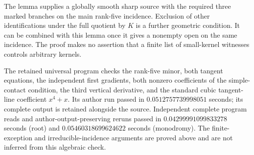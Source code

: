 \begin{remark}
\label{rem:DE-A4-uniform-triple-local-scope}
The lemma supplies a globally smooth sharp source with the required
three marked branches on the main rank-five incidence.
Exclusion of other identifications under the full quotient by $K$
is a further geometric condition.  It can be combined with this
lemma once it gives a nonempty open on the same incidence.
The proof makes no assertion that a finite list of small-kernel
witnesses controls arbitrary kernels.

The retained universal program
checks the rank-five minor, both tangent equations, the independent
first gradients, both nonzero coefficients of the simple-contact
condition, the third vertical derivative, and the standard cubic
tangent-line coefficient $x^4+x$.
Its author run passed in $0.0512757739998051$ seconds; its complete
output is retained alongside the source.
Independent complete program reads and author-output-preserving reruns
passed in $0.04299991099833278$ seconds (root) and
$0.05460318699624622$ seconds (monodromy).
The finite-exception and irreducible-incidence arguments are proved
above and are not inferred from this algebraic check.
\end{remark}
